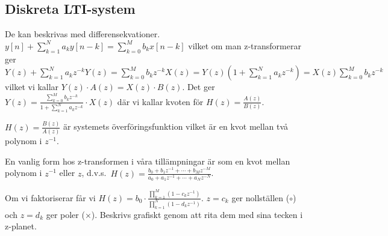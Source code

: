 \documentclass[a4paper]{article}
\begin{document}
\providecommand\fname{}
\renewcommand\fname{19-10-16}

\subsection{Diskreta LTI-system}
De kan beskrivas med differensekvationer.
\(
    y[n] + \sum_{k=1}^N a_k y[n-k] = \sum_{k=0}^M b_k x[n-k]
\) vilket om man z-transformerar ger \(
    Y(z) + \sum_{k=1}^N a_k z^{-k} Y(z) = \sum_{k=0}^M b_k z^{-k} X(z)
        = Y(z) (1 + \sum_{k=1}^N a_k z^{-k}) = X(z) \sum_{k=0}^M b_k z^{-k}
\) vilket vi kallar \(
    Y(z) \cdot A(z) = X(z) \cdot B(z)
\). Det ger \(
    Y(z) = \frac{\sum_{k=0}^M b_k z^{-k}}{1 + \sum_{k=1}^N a_k z^{-k}} \cdot X(z)
\) där vi kallar kvoten för \(
    H(z) = \frac{A(z)}{B(z)} 
\).

\(
    H(z) = \frac{B(z)}{A(z)} 
\) är systemets överföringsfunktion vilket är en kvot mellan två polynom i \(
    z^{-1}
\). 

En vanlig form hos z-transformen i våra tillämpningar är som en kvot mellan 
polynom i \(
    z^{-1}
\) eller \(
    z
\), d.v.s.\ \(
    H(z) = \frac{b_0 + b_1z^{-1} + \cdots + b_M z^{-M}}{a_0 + a_1 z^{-1} + \cdots + a_N z^{-N}} 
\). 

Om vi faktoriserar får vi \(
    H(z) = b_0 \cdot \frac{\prod_{k=1}^M (1-c_k z^{-1})}{\prod_{k=1}^N (1-d_k z^{-1})} 
\). \(
    z = c_k
\) ger nollställen (\(
    \circ
\)) och \(
    z=d_k
\) ger poler (\(
    \times
\)). Beskrivs grafiskt genom att rita dem med sina tecken i z-planet.
\end{document}
